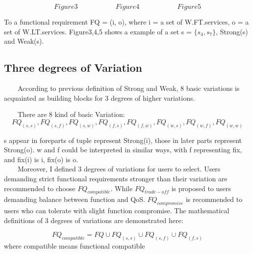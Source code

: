\documentclass[senior,final,11pt]{iscs-thesis}
\begin{document}
\[Figure3~~~~~~~~~~~~~~~~~~~~~~~~~
Figure4~~~~~~~~~~~~~~~~~~~~~~~~~
Figure5\]

To a functional requirement FQ = (i, o), where i = a set of W.FT.services, o = a set of W.LT.services. Figure3,4,5 shows a example of a set s = $\{s_4,s_7\}$, Strong(s) and Weak(s).
\subsection{Three degrees of Variation}

~~~~According to previous definition of Strong and Weak, 8 basic variations is acquainted as building blocks for 3 degrees of higher variations. 

~~~~There are 8 kind of basic Variation: 
\[FQ_{(s,s)}, FQ_{(s,f)}, FQ_{(s,w)}, FQ_{(f,s)}, FQ_{(f,w)}, FQ_{(w,s)}, FQ_{(w,f)}, FQ_{(w,w)}\]



s appear in foreparts of tuple represent Strong(i), those in later parts represent Strong(o). w and f could be interpreted in similar ways, with f representing fix, and fix(i) is i, fix(o) is o. \\
~~~~Moreover, I defined 3 degrees of variations for users to select. Users demanding strict functional requirements stronger than their variation are recommended to choose $FQ_{compatible}$. While $FQ_{trade-off}$ is proposed to users demanding  balance between function and QoS. $FQ_{compromise}$ is recommended to users who can tolerate with slight function compromise. The mathematical definitions of 3 degrees of variations are demonstrated here: 


\[FQ_{compatible} = FQ \cup FQ_{(s,s)} \cup FQ_{(s,f)} \cup FQ_{(f,s)}\]where compatible means functional compatible
\end{document}
